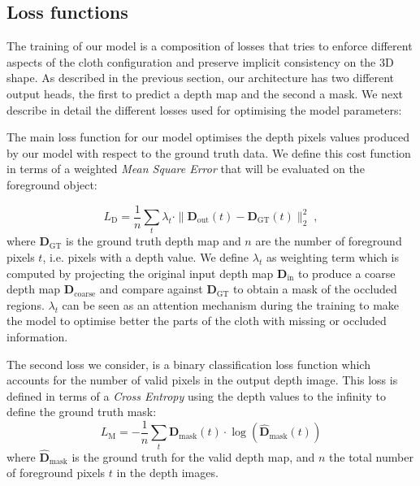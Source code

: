 \subsection{Loss functions}

The training of our model is a composition of losses that tries to enforce different aspects of the cloth configuration and preserve implicit consistency on the 3D shape. As described in the previous section, our architecture has two different output heads, the first to predict a depth map and the second a mask. We next describe in detail the different losses used for optimising the model parameters:

\vspace{1mm}
 The main loss function for our model optimises the depth pixels values produced by our model with respect to the ground truth data. We define this cost function in terms of a weighted \textit{Mean Square Error} that will be evaluated on the foreground object:

\begin{equation}
     L_\textrm{D} = \frac{1}{n}\sum_{t} \lambda_t \cdot \| \mathbf{D}_{\textrm{out}}(t) - \mathbf{D}_{\textrm{GT}}(t) \| _2 ^ 2\;,
\end{equation}
where $\mathbf{D}_{\textrm{GT}}$ is the ground truth depth map and $n$ are the number of foreground pixels $t$, i.e. pixels with a depth value. We define $\lambda_t$ as weighting term which is computed by projecting the original input depth map $\mathbf{D}_{\textrm{in}}$ to produce a coarse depth map $\mathbf{D}_{\textrm{coarse}}$ and compare against $\mathbf{D}_{\textrm{GT}}$ to obtain a mask of the occluded regions. $\lambda_t$ can be seen as an attention mechanism during the training to make the model to optimise better the parts of the cloth with missing or occluded information.

\vspace{1mm}
 The second loss we consider, is a binary classification loss function which accounts for the number of valid pixels in the output depth image. This loss is defined in terms of a {\em Cross Entropy} using the depth values to the infinity to define the ground truth mask:
\begin{equation}
     L_\textrm{M} = - \frac{1}{n} \sum_{t} \mathbf{D}_{\text{mask}}(t) \cdot \log(\hat{\mathbf{D}}_{\text{mask}}(t))
\end{equation}
where $\hat{\mathbf{D}}_{\text{mask}}$ is the ground truth for the valid depth map, and $n$ the total number of foreground pixels $t$ in the depth images.

